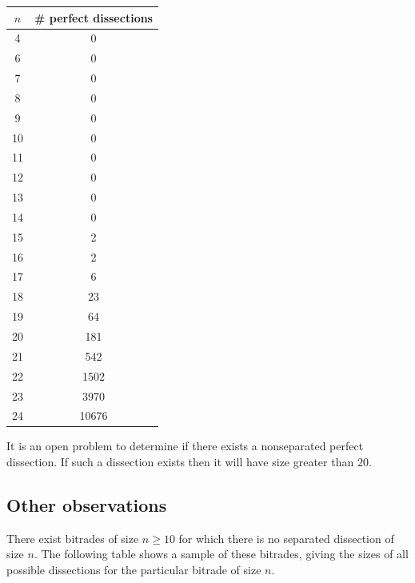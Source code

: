 \documentclass[12pt,amstags,fleqn]{article}
\theoremstyle{plain}
\theoremstyle{definition}
\begin{document}
\begin{center}
\begin{tabular}{|c|c|}
\hline $n$ & \# perfect dissections \\
\hline
\hline 4  & 0     \\
\hline 6  & 0     \\
\hline 7  & 0     \\
\hline 8  & 0     \\
\hline 9  & 0     \\
\hline 10 & 0     \\
\hline 11 & 0     \\
\hline 12 & 0     \\
\hline 13 & 0     \\
\hline 14 & 0     \\
\hline 15 & 2     \\
\hline 16 & 2     \\
\hline 17 & 6     \\
\hline 18 & 23    \\
\hline 19 & 64    \\
\hline 20 & 181   \\
\hline 21 & 542   \\
\hline 22 & 1502  \\
\hline 23 & 3970  \\
\hline 24 & 10676 \\
\hline
\end{tabular}
\end{center}

It is an open problem to determine if there exists a nonseparated
perfect dissection. If such a dissection exists then it will have size
greater than $20$.

\subsection{Other observations}

There exist bitrades of size $n \geq 10$ for which there is no
separated dissection of size $n$. The following table shows a sample
of these bitrades, giving the sizes of all possible dissections for
the particular bitrade of size $n$.
\end{document}
